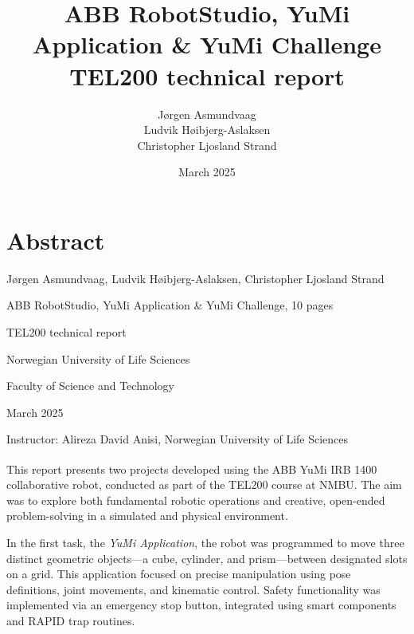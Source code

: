 \documentclass[a4paper,12pt]{article}
\begin{document}
\begin{titlepage}
    \centering
    \vfill
    
    \title{ABB RobotStudio, YuMi Application \& YuMi Challenge \\ \large TEL200 technical report\vspace{10cm}}
    \author{J\o rgen Asmundvaag \\ Ludvik H\o ibjerg-Aslaksen \\ Christopher Ljosland Strand}
    \date{March 2025}
    \maketitle
    \vfill
    \begin{figure}
        
    \end{figure}
    \vfill
\end{titlepage}

\section*{Abstract}
Jørgen Asmundvaag, Ludvik Høibjerg-Aslaksen, Christopher Ljosland Strand

ABB RobotStudio, YuMi Application \& YuMi Challenge, 10 pages

TEL200 technical report

Norwegian University of Life Sciences

Faculty of Science and Technology

March 2025

Instructor: Alireza David Anisi, Norwegian University of Life Sciences
\vspace{3em} %

This report presents two projects developed using the ABB YuMi IRB\textsuperscript{\textregistered} 1400 collaborative robot, conducted as part of the TEL200 course at NMBU. The aim was to explore both fundamental robotic operations and creative, open-ended problem-solving in a simulated and physical environment.

In the first task, the \textit{YuMi Application}, the robot was programmed to move three distinct geometric objects—a cube, cylinder, and prism—between designated slots on a grid. This application focused on precise manipulation using pose definitions, joint movements, and kinematic control. Safety functionality was implemented via an emergency stop button, integrated using smart components and RAPID trap routines.
\end{document}
